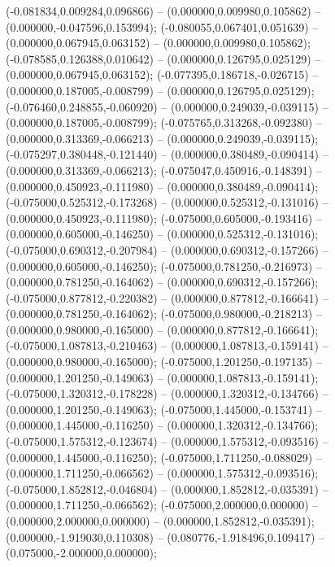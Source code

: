  (-0.081834,0.009284,0.096866) -- (0.000000,0.009980,0.105862) -- (0.000000,-0.047596,0.153994);
 (-0.080055,0.067401,0.051639) -- (0.000000,0.067945,0.063152) -- (0.000000,0.009980,0.105862);
 (-0.078585,0.126388,0.010642) -- (0.000000,0.126795,0.025129) -- (0.000000,0.067945,0.063152);
 (-0.077395,0.186718,-0.026715) -- (0.000000,0.187005,-0.008799) -- (0.000000,0.126795,0.025129);
 (-0.076460,0.248855,-0.060920) -- (0.000000,0.249039,-0.039115) -- (0.000000,0.187005,-0.008799);
 (-0.075765,0.313268,-0.092380) -- (0.000000,0.313369,-0.066213) -- (0.000000,0.249039,-0.039115);
 (-0.075297,0.380448,-0.121440) -- (0.000000,0.380489,-0.090414) -- (0.000000,0.313369,-0.066213);
 (-0.075047,0.450916,-0.148391) -- (0.000000,0.450923,-0.111980) -- (0.000000,0.380489,-0.090414);
 (-0.075000,0.525312,-0.173268) -- (0.000000,0.525312,-0.131016) -- (0.000000,0.450923,-0.111980);
 (-0.075000,0.605000,-0.193416) -- (0.000000,0.605000,-0.146250) -- (0.000000,0.525312,-0.131016);
 (-0.075000,0.690312,-0.207984) -- (0.000000,0.690312,-0.157266) -- (0.000000,0.605000,-0.146250);
 (-0.075000,0.781250,-0.216973) -- (0.000000,0.781250,-0.164062) -- (0.000000,0.690312,-0.157266);
 (-0.075000,0.877812,-0.220382) -- (0.000000,0.877812,-0.166641) -- (0.000000,0.781250,-0.164062);
 (-0.075000,0.980000,-0.218213) -- (0.000000,0.980000,-0.165000) -- (0.000000,0.877812,-0.166641);
 (-0.075000,1.087813,-0.210463) -- (0.000000,1.087813,-0.159141) -- (0.000000,0.980000,-0.165000);
 (-0.075000,1.201250,-0.197135) -- (0.000000,1.201250,-0.149063) -- (0.000000,1.087813,-0.159141);
 (-0.075000,1.320312,-0.178228) -- (0.000000,1.320312,-0.134766) -- (0.000000,1.201250,-0.149063);
 (-0.075000,1.445000,-0.153741) -- (0.000000,1.445000,-0.116250) -- (0.000000,1.320312,-0.134766);
 (-0.075000,1.575312,-0.123674) -- (0.000000,1.575312,-0.093516) -- (0.000000,1.445000,-0.116250);
 (-0.075000,1.711250,-0.088029) -- (0.000000,1.711250,-0.066562) -- (0.000000,1.575312,-0.093516);
 (-0.075000,1.852812,-0.046804) -- (0.000000,1.852812,-0.035391) -- (0.000000,1.711250,-0.066562);
 (-0.075000,2.000000,0.000000) -- (0.000000,2.000000,0.000000) -- (0.000000,1.852812,-0.035391);
 (0.000000,-1.919030,0.110308) -- (0.080776,-1.918496,0.109417) -- (0.075000,-2.000000,0.000000);
